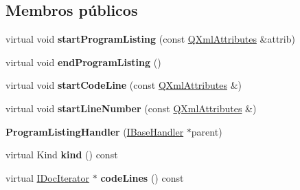 \subsection*{Membros públicos}
\begin{DoxyCompactItemize}
\item 
\hypertarget{class_program_listing_handler_ae03e5c8c64478d96c0e32aa7738e16b6}{virtual void {\bfseries start\-Program\-Listing} (const \hyperlink{class_q_xml_attributes}{Q\-Xml\-Attributes} \&attrib)}\label{class_program_listing_handler_ae03e5c8c64478d96c0e32aa7738e16b6}

\item 
\hypertarget{class_program_listing_handler_afd8a55eadb40973e3251998ab45bc484}{virtual void {\bfseries end\-Program\-Listing} ()}\label{class_program_listing_handler_afd8a55eadb40973e3251998ab45bc484}

\item 
\hypertarget{class_program_listing_handler_a65896bd5afdbb5e1465384b26f009b6b}{virtual void {\bfseries start\-Code\-Line} (const \hyperlink{class_q_xml_attributes}{Q\-Xml\-Attributes} \&)}\label{class_program_listing_handler_a65896bd5afdbb5e1465384b26f009b6b}

\item 
\hypertarget{class_program_listing_handler_a6c05366909c31e60e5aba2ba1b93fefc}{virtual void {\bfseries start\-Line\-Number} (const \hyperlink{class_q_xml_attributes}{Q\-Xml\-Attributes} \&)}\label{class_program_listing_handler_a6c05366909c31e60e5aba2ba1b93fefc}

\item 
\hypertarget{class_program_listing_handler_a6d3e4a989f657fb65bf494d6e06c2d42}{{\bfseries Program\-Listing\-Handler} (\hyperlink{class_i_base_handler}{I\-Base\-Handler} $\ast$parent)}\label{class_program_listing_handler_a6d3e4a989f657fb65bf494d6e06c2d42}

\item 
\hypertarget{class_program_listing_handler_af8e62c8a81ddf2283205cc8955de50eb}{virtual Kind {\bfseries kind} () const }\label{class_program_listing_handler_af8e62c8a81ddf2283205cc8955de50eb}

\item 
\hypertarget{class_program_listing_handler_a789d7ebd6d184f1b21a8dbf68050087c}{virtual \hyperlink{class_i_doc_iterator}{I\-Doc\-Iterator} $\ast$ {\bfseries code\-Lines} () const }\label{class_program_listing_handler_a789d7ebd6d184f1b21a8dbf68050087c}

\end{DoxyCompactItemize}
